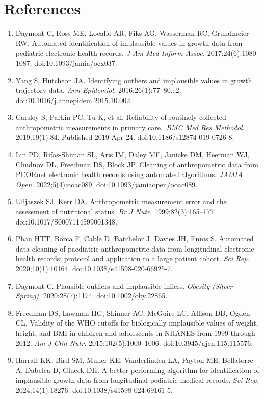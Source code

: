 \documentclass[11pt]{article}
\begin{document}
\section*{References}\label{references}

\begin{enumerate}
\def\labelenumi{\arabic{enumi}.}
\item
  Daymont C, Ross ME, Localio AR, Fiks AG, Wasserman RC, Grundmeier RW. Automated identification of implausible values in growth data from pediatric electronic health records. \emph{J Am Med Inform Assoc.} 2017;24(6):1080--1087. doi:10.1093/jamia/ocx037.
\item
  Yang S, Hutcheon JA. Identifying outliers and implausible values in growth trajectory data. \emph{Ann Epidemiol.} 2016;26(1):77--80.e2. doi:10.1016/j.annepidem.2015.10.002.
\item
  Carsley S, Parkin PC, Tu K, et al. Reliability of routinely collected anthropometric measurements in primary care.~\emph{BMC Med Res Methodol}. 2019;19(1):84. Published 2019 Apr 24. doi:10.1186/s12874-019-0726-8.
\item
  Lin PD, Rifas-Shiman SL, Aris IM, Daley MF, Janicke DM, Heerman WJ, Chudnov DL, Freedman DS, Block JP. Cleaning of anthropometric data from PCORnet electronic health records using automated algorithms. \emph{JAMIA Open.} 2022;5(4):ooac089. doi:10.1093/jamiaopen/ooac089.
\item
  Ulijaszek SJ, Kerr DA. Anthropometric measurement error and the assessment of nutritional status. \emph{Br J Nutr.} 1999;82(3):165--177. doi:10.1017/S0007114599001348.
\item
  Phan HTT, Borca F, Cable D, Batchelor J, Davies JH, Ennis S. Automated data cleaning of paediatric anthropometric data from longitudinal electronic health records: protocol and application to a large patient cohort. \emph{Sci Rep.} 2020;10(1):10164. doi:10.1038/s41598-020-66925-7.
\item
  Daymont C. Plausible outliers and implausible inliers. \emph{Obesity (Silver Spring).} 2020;28(7):1174. doi:10.1002/oby.22865.
\item
  Freedman DS, Lawman HG, Skinner AC, McGuire LC, Allison DB, Ogden CL. Validity of the WHO cutoffs for biologically implausible values of weight, height, and BMI in children and adolescents in NHANES from 1999 through 2012. \emph{Am J Clin Nutr.} 2015;102(5):1000--1006. doi:10.3945/ajcn.115.115576.
\item
  Harrall KK, Bird SM, Muller KE, Vanderlinden LA, Payton ME, Bellatorre A, Dabelea D, Glueck DH. A better performing algorithm for identification of implausible growth data from longitudinal pediatric medical records. \emph{Sci Rep.} 2024;14(1):18276. doi:10.1038/s41598-024-69161-5.

\end{enumerate}
\end{document}
